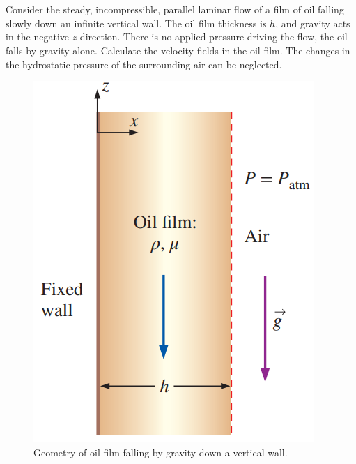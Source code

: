 \section{}
Consider the steady, incompressible, parallel laminar flow of a film of oil falling slowly down an infinite vertical wall.
The oil film thickness is $h$, and gravity acts in the negative $z$-direction. There is no applied pressure driving the flow,
the oil falls by gravity alone. Calculate the velocity fields in the oil film. The changes in the hydrostatic pressure of the
surrounding air can be neglected.   
\begin{figure}[h]
    \centering
    \includegraphics[width=0.3\linewidth]{Questions/Figures/Q3ProblemDiagram.png}
    \caption{Geometry of oil film falling by gravity down a vertical wall.}
    \label{fig:oil_film}
\end{figure}

